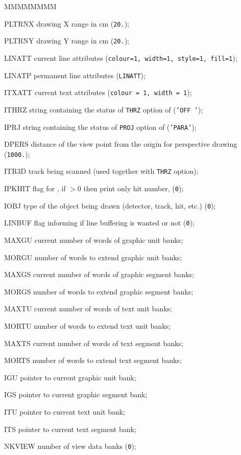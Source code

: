 \begin{DLtt}{MMMMMMMM}
\item[PLTRNX] drawing X range in cm ({\tt 20.});
\item[PLTRNY] drawing Y range in cm ({\tt 20.});
\item[LINATT] current line attributes ({\tt colour=1, width=1, style=1,
fill=1});
\item[LINATP] permanent line attributes  ({\tt LINATT});
\item[ITXATT] current text attributes  ({\tt colour = 1, width = 1});
\item[ITHRZ] string containing the status of {\tt THRZ} option of
              ({\tt 'OFF '});
\item[IPRJ] string containing the status of {\tt PROJ} option of
              ({\tt 'PARA'});
\item[DPERS] distance of the view point from
the origin for perspective drawing ({\tt 1000.});
\item[ITR3D]track being scanned (used together with {\tt THRZ} option);
\item[IPKHIT]flag for , if
$>0$ then print only hit number, ({\tt 0});
\item[IOBJ]type of the object being drawn (detector, track, hit, etc.)
({\tt 0});
\item[LINBUF]flag informing  if line buffering is wanted or
not ({\tt 0});
\item[MAXGU]current number of words of graphic unit banks;
\item[MORGU]number of words to extend graphic unit banks;
\item[MAXGS]current number of words of graphic segment banks;
\item[MORGS]number of words to extend graphic segment banks;
\item[MAXTU]current number of words of text unit banks;
\item[MORTU]number of words to extend text unit banks;
\item[MAXTS]current number of words of text segment banks;
\item[MORTS]number of words to extend text segment banks;
\item[IGU]pointer to current graphic unit bank;
\item[IGS]pointer to current graphic segment bank;
\item[ITU]pointer to current text unit bank;
\item[ITS]pointer to current text segment bank;
\item[NKVIEW]number of view data banks ({\tt 0});

\end{DLtt}
